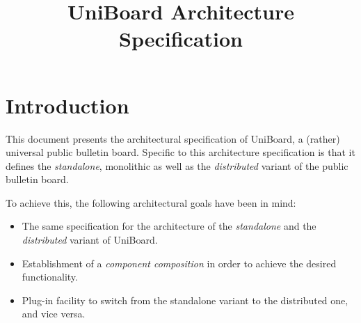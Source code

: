 \documentclass[oneside]{scrreprt}
\newcommand{\uniboard}{\mbox{UniBoard}}
\begin{document}
\lstset{
  language=Java,
  basicstyle=\footnotesize\sffamily, %
  keywordstyle=\bfseries,
  numbers=right
}

\title{UniBoard Architecture Specification}
\maketitle

\begin{versionhistory}
\end{versionhistory}




\tableofcontents

\chapter{Introduction}

This document presents the architectural specification of \uniboard,
a (rather) universal public bulletin board. Specific to this
architecture specification is that it defines the \emph{standalone},
monolithic as well as the \emph{distributed} variant of the
public bulletin board.

To achieve this, the following architectural goals have been in mind:

\begin{itemize}
	\item The same specification for the architecture
		of the \emph{standalone} and the \emph{distributed}
		variant of \uniboard.
	\item Establishment of a \emph{component composition} in
		order to achieve the desired functionality.
	\item Plug-in facility to switch from the standalone variant
		to the distributed one, and vice versa.
\end{itemize}
\end{document}
